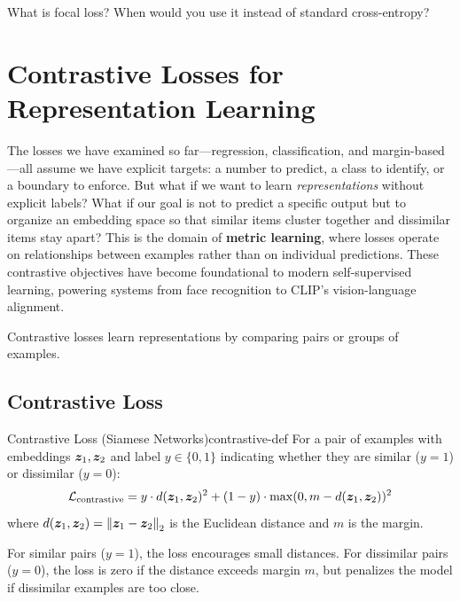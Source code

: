 \documentclass[../../main.tex]{subfiles}
\begin{document}
\begin{checkpoint}
What is focal loss? When would you use it instead of standard cross-entropy?
\end{checkpoint}

\section{Contrastive Losses for Representation Learning}
\label{sec:contrastive-losses}

The losses we have examined so far---regression, classification, and margin-based---all assume we have explicit targets: a number to predict, a class to identify, or a boundary to enforce. But what if we want to learn \emph{representations} without explicit labels? What if our goal is not to predict a specific output but to organize an embedding space so that similar items cluster together and dissimilar items stay apart? This is the domain of \textbf{metric learning}, where losses operate on relationships between examples rather than on individual predictions. These contrastive objectives have become foundational to modern self-supervised learning, powering systems from face recognition to CLIP's vision-language alignment.

Contrastive losses learn representations by comparing pairs or groups of examples.

\subsection{Contrastive Loss}

\begin{definition}{Contrastive Loss (Siamese Networks)}{contrastive-def}
For a pair of examples with embeddings $\boldsymbol{z}_1, \boldsymbol{z}_2$ and label $y \in \{0, 1\}$ indicating whether they are similar ($y=1$) or dissimilar ($y=0$):
\[
    \mathcal{L}_{\text{contrastive}} = y \cdot d(\boldsymbol{z}_1, \boldsymbol{z}_2)^2 + (1-y) \cdot \max(0, m - d(\boldsymbol{z}_1, \boldsymbol{z}_2))^2
\]
where $d(\boldsymbol{z}_1, \boldsymbol{z}_2) = \left\lVert \boldsymbol{z}_1 - \boldsymbol{z}_2 \right\rVert_2$ is the Euclidean distance and $m$ is the margin.
\end{definition}

\begin{intuition}
For similar pairs ($y=1$), the loss encourages small distances. For dissimilar pairs ($y=0$), the loss is zero if the distance exceeds margin $m$, but penalizes the model if dissimilar examples are too close.
\end{intuition}
\end{document}
